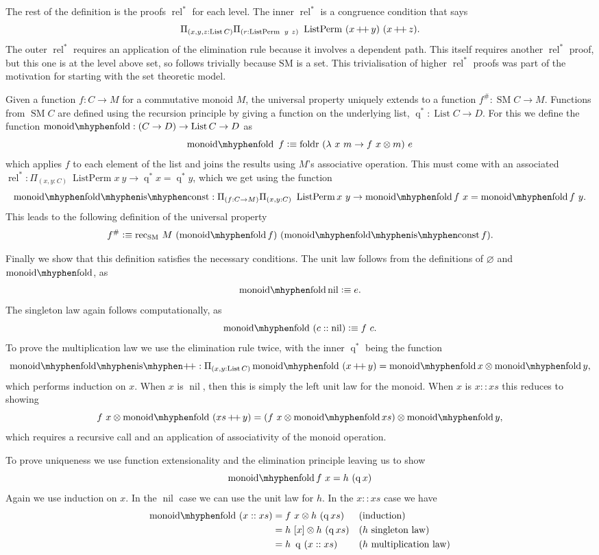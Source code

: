 \documentclass[12pt, parskip, DIV=14]{scrbook}
\DeclareMathOperator\lapp{+\mkern-3mu+}
\newcommand{\defeq}{\vcentcolon\equiv}
\newcommand{\SM}{\operatorname{SM}}
\newcommand{\List}{\operatorname{List}}
\newcommand{\q}{\operatorname{q}}
\newcommand{\qs}{\operatorname{q}^*}
\newcommand{\rels}{\operatorname{rel}^*}
\newcommand{\monfold}{\operatorname{monoid\mhyphen fold}}
\newcommand{\monfoldconst}{\operatorname{monoid\mhyphen fold\mhyphen is\mhyphen const}}
\newcommand{\ListPerm}{\operatorname{ListPerm}}
\newcommand{\nil}{\operatorname{nil}}
\begin{document}
The rest of the definition is the proofs $\rels$ for each level. The inner $\rels$ is a congruence condition that says
$$\Pi_{(x , y , z : \List C)}\Pi_{(r : \ListPerm~y~z)}~\ListPerm~(x \lapp y)~(x \lapp z).$$ The outer $\rels$ requires an application of the elimination rule because it involves a dependent path. This itself requires another $\rels$ proof, but this one is at the level above set, so follows trivially because $\mathrm{SM}$ is a set. This trivialisation of higher $\rels$ proofs was part of the motivation for starting with the set theoretic model.

Given a function $f : C \to M$ for a commutative monoid $M$, the universal property uniquely extends to a function $f^\# : \SM C \to M$. Functions from $\SM C$ are defined using the recursion principle by giving a function on the underlying list, $\qs : \List C \to D$. For this we define the function $\monfold : (C \to D) \to \List C \to D$ as
$$\monfold~f \defeq \mathrm{foldr}~(\lambda~x~m \to f~x \otimes m)~e$$
which applies $f$ to each element of the list and joins the results using $M$'s associative operation. This must come with an associated $\rels : \Pi_{(x , y : C)}~\ListPerm x~y \to \qs x = \qs y$, which we get using the function $$\monfoldconst : \Pi_{(f : C \to M)}\Pi_{(x , y : C)}~\ListPerm x~y \to \monfold f~x = \monfold f~y.$$
This leads to the following definition of the universal property
$$f^\# \defeq \mathrm{rec}_{\SM}~M~(\monfold f)~(\monfoldconst f).$$

Finally we show that this definition satisfies the necessary conditions. The unit law follows from the definitions of $\varnothing$ and $\monfold$, as
$$\monfold \nil \defeq e.$$ The singleton law again follows computationally, as
$$\monfold~(c :: \nil) \defeq f~c.$$ To prove the multiplication law we use the elimination rule twice, with the inner $\qs$ being the function
$$\mathrm{monoid\mhyphen fold\mhyphen is\mhyphen\mkern-3mu\lapp} : \Pi_{(x , y : \List C)}\monfold~(x \lapp y) = \monfold x \otimes \monfold y,$$ which performs induction on $x$. When $x$ is $\nil$, then this is simply the left unit law for the monoid. When $x$ is $x :: xs$ this reduces to showing
$$f~x \otimes \monfold~(xs \lapp y) = (f~x \otimes \monfold xs) \otimes \monfold y,$$ which requires a recursive call and an application of associativity of the monoid operation.

To prove uniqueness we use function extensionality and the elimination principle leaving us to show
$$\monfold f~x = h~(\q x)$$
Again we use induction on $x$. In the $\nil$ case we can use the unit law for $h$. In the $x :: xs$ case we have
\begin{align*}
 \monfold~(x :: xs) &= f~x \otimes h~(\q xs) &&\text{(induction)} \\
  &= h~[x] \otimes h~(\q xs) &&\text{($h$ singleton law)} \\
  &= h~\q~(x :: xs) &&\text{($h$ multiplication law)}
\end{align*}
\end{document}
